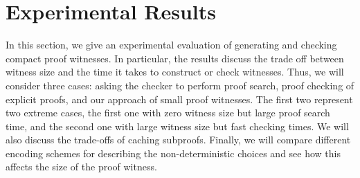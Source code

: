 \documentclass{llncs}
\newcommand{\vd}{\vdash}
\begin{document}







\section{Experimental Results}

In this section, we give an experimental evaluation of generating and
checking compact proof witnesses. In particular, the results discuss
the trade off between witness size and the time it takes to construct
or check witnesses. Thus, we will consider three cases: asking the
checker to perform proof search, proof checking of explicit proofs,
and our approach of small proof witnesses. The first two represent two
extreme cases, the first one with zero witness size but large proof
search time, and the second one with large witness size but fast
checking times. We will also discuss the trade-offs of caching
subproofs. Finally, we will compare different encoding schemes for
describing the non-deterministic choices and see how this affects the
size of the proof witness.
\end{document}
